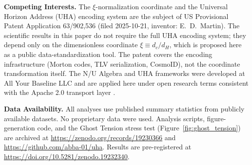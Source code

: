 \documentclass[twocolumn]{aastex631}
\begin{document}
\vspace{4pt}
\noindent\textbf{Competing Interests.}
The $\xi$-normalization coordinate and the Universal Horizon Address (UHA)
encoding system are the subject of US Provisional Patent Application
63/902,536 (filed 2025-10-21, inventor: E.~D.~Martin).
The scientific results in this paper do not require the full UHA encoding
system; they depend only on the dimensionless coordinate $\xi \equiv d_c/d_H$,
which is proposed here as a public data-standardization tool.
The patent covers the encoding infrastructure (Morton codes, TLV serialization,
CosmoID), not the coordinate transformation itself.
The N/U Algebra and UHA frameworks were developed at All Your Baseline LLC
\citep{Martin2025_NU_Algebra, Martin2025_UHA_Patent} and are applied here
under open research terms consistent with the Apache 2.0 transport layer
\citep{Martin2025_L4_UHA_Transport}.

\vspace{4pt}
\noindent\textbf{Data Availability.}
All analyses use published summary statistics from publicly available datasets.
No proprietary data were used.
Analysis scripts, figure-generation code, and the Ghost Tension stress test
(Figure~\ref{fig:ghost_tension}) are archived at
\url{https://zenodo.org/records/19230366} and
\url{https://github.com/abba-01/uha}.
Results are pre-registered at
\url{https://doi.org/10.5281/zenodo.19232340}.



\end{document}
